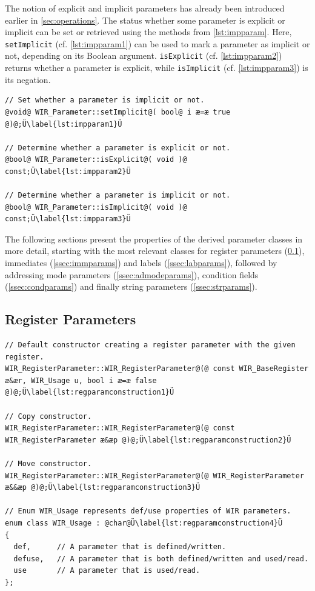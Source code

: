 The notion of explicit and implicit parameters has already been introduced earlier in \cref{sec:operations}.
The status whether some parameter is explicit or implicit can be set or retrieved using the methods from \cref{lst:impparam}.
Here, \texttt{setImplicit} (cf. \cref{lst:impparam1}) can be used to mark a parameter as implicit or not, depending on its Boolean argument.
\texttt{isExplicit} (cf. \cref{lst:impparam2}) returns whether a parameter is explicit, while \texttt{isImplicit} (cf. \cref{lst:impparam3}) is its negation.

\begin{lstlisting}[style=code,float=t,caption={Handling of Explicit and Implicit \texttt{WIR\_Parameter}s},label=lst:impparam]
// Set whether a parameter is implicit or not.
@void@ WIR_Parameter::setImplicit@( bool@ i æ=æ true @)@;Ü\label{lst:impparam1}Ü

// Determine whether a parameter is explicit or not.
@bool@ WIR_Parameter::isExplicit@( void )@ const;Ü\label{lst:impparam2}Ü

// Determine whether a parameter is implicit or not.
@bool@ WIR_Parameter::isImplicit@( void )@ const;Ü\label{lst:impparam3}Ü
\end{lstlisting}

The following sections present the properties of the derived parameter classes in more detail, starting with the most relevant classes for register parameters (\cref{ssec:regparams}), immediates (\cref{ssec:immparams}) and labels (\cref{ssec:labparams}), followed by addressing mode parameters (\cref{ssec:admodeparams}), condition fields (\cref{ssec:condparams}) and finally string parameters (\cref{ssec:strparams}).


\subsection{Register Parameters}
\label{ssec:regparams}

\begin{lstlisting}[style=code,float=!b,caption={Constructors of Class \texttt{WIR\_RegisterParameter}},label=lst:regparamconstruction]
// Default constructor creating a register parameter with the given register.
WIR_RegisterParameter::WIR_RegisterParameter@(@ const WIR_BaseRegister æ&ær, WIR_Usage u, bool i æ=æ false @)@;Ü\label{lst:regparamconstruction1}Ü

// Copy constructor.
WIR_RegisterParameter::WIR_RegisterParameter@(@ const WIR_RegisterParameter æ&æp @)@;Ü\label{lst:regparamconstruction2}Ü

// Move constructor.
WIR_RegisterParameter::WIR_RegisterParameter@(@ WIR_RegisterParameter æ&&æp @)@;Ü\label{lst:regparamconstruction3}Ü

// Enum WIR_Usage represents def/use properties of WIR parameters.
enum class WIR_Usage : @char@Ü\label{lst:regparamconstruction4}Ü
{
  def,      // A parameter that is defined/written.
  defuse,   // A parameter that is both defined/written and used/read.
  use       // A parameter that is used/read.
};
\end{lstlisting}

